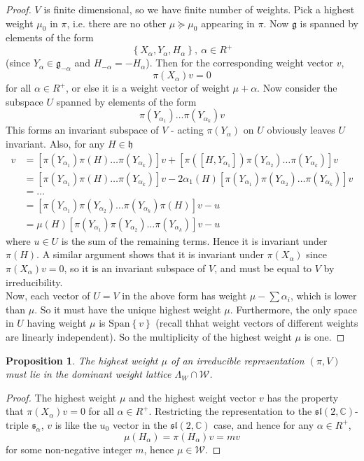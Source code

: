 \documentclass[11pt]{book}
\newtheorem{proposition}[theorem]{Proposition}
\newcommand{\bb}[1]{\mathbb{#1}}
\newcommand{\mc}[1]{\mathcal{#1}}
\newcommand{\mf}[1]{\mathfrak{#1}}
\begin{document}
\begin{proof}
$V$ is finite dimensional, so we have finite number of weights. Pick a highest weight $\mu_0$ in $\pi$, i.e. there are no other $\mu \succeq \mu_0$ appearing in $\pi$. Now $\mf{g}$ is spanned by elements of the form $$\left\{X_{\alpha}, Y_{\alpha}, H_{\alpha}\right\},\ \alpha \in R^+$$
(since $Y_{\alpha} \in \mf{g}_{-\alpha}$ and $H_{-\alpha} = -H_{\alpha}$). Then for the corresponding weight vector $v$,
$$\pi(X_{\alpha})v = 0$$
for all $\alpha \in R^+$, or else it is a weight vector of weight $\mu + \alpha$. Now consider the subspace $U$ spanned by elements of the form
$$\pi(Y_{\alpha_1})\dots \pi(Y_{\alpha_k})v$$
This forms an invariant subspace of $V$ - acting $\pi(Y_{\alpha})$ on $U$ obviously leaves $U$ invariant. Also, for any $H \in \mf{h}$
\begin{align*}
[\pi(H)\pi(Y_{\alpha_1})\dots \pi(Y_{\alpha_k})]v &= [\pi(Y_{\alpha_1})\pi(H)\dots \pi(Y_{\alpha_k})]v + [\pi([H,Y_{\alpha_1}])\pi(Y_{\alpha_2})\dots \pi(Y_{\alpha_k})]v\\
&= [\pi(Y_{\alpha_1})\pi(H)\dots \pi(Y_{\alpha_k})]v -2\alpha_1(H) [\pi(Y_{\alpha_1})\pi(Y_{\alpha_2})\dots \pi(Y_{\alpha_k})]v\\
&= \dots \\
&= [\pi(Y_{\alpha_1})\pi(Y_{\alpha_2}) \dots \pi(Y_{\alpha_k})\pi(H)]v - u\\
&= \mu(H)[\pi(Y_{\alpha_1})\pi(Y_{\alpha_2}) \dots \pi(Y_{\alpha_k})]v - u
\end{align*}
where $u \in U$ is the sum of the remaining terms. Hence it is invariant under $\pi(H)$. A similar argument shows that it is invariant under $\pi(X_{\alpha})$ since $\pi(X_{\alpha})v = 0$, so it is an invariant subspace of $V$, and must be equal to $V$ by irreducibility.\\
Now, each vector of $U = V$ in the above form has weight $\mu - \sum \alpha_i$, which is lower than $\mu$. So it must have the unique highest weight $\mu$. Furthermore, the only space in $U$ having weight $\mu$ is $\mathrm{Span}\left\{v\right\}$ (recall thhat weight vectors of different weights are linearly independent). So the multiplicity of the highest weight $\mu$ is one.
\end{proof}
\begin{proposition}
The highest weight $\mu$ of an irreducible representation $(\pi,V)$ must lie in the dominant weight lattice $\Lambda_W \cap \mc{W}$.
\end{proposition}
\begin{proof}
The highest weight $\mu$ and the highest weight vector $v$ has the property that $\pi(X_{\alpha})v = 0$ for all $\alpha \in R^+$. Restricting the representation to the $\mf{sl}(2,\bb{C})$-triple $\mf{s}_{\alpha}$, $v$ is like the $u_0$ vector in the $\mf{sl}(2,\bb{C})$ case, and hence for any $\alpha \in R^+$,
$$\mu(H_{\alpha}) = \pi(H_{\alpha})v = mv$$
for some non-negative integer $m$, hence $\mu \in \mc{W}$.
\end{proof}
\end{document}
